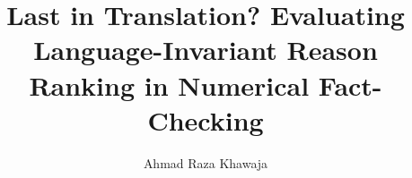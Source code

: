 \documentclass[acmlarge,screen,nonacm]{acmart}
\begin{document}


\title{Last in Translation? Evaluating Language-Invariant Reason Ranking in Numerical Fact-Checking}

\author{Ahmad Raza Khawaja}

\renewcommand{\shortauthors}{Ahmad Raza Khawaja}
\end{document}

